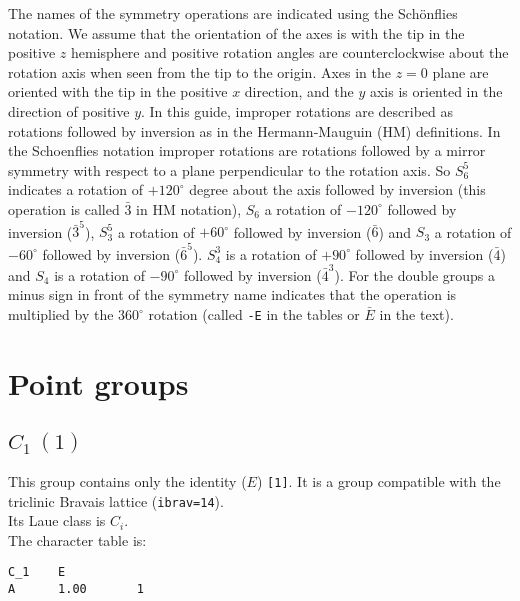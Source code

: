 \documentclass[12pt,a4paper,twoside]{report}
\begin{document}
The names of the symmetry operations are indicated using
the Sch\"onflies notation. 
We assume that the orientation of the axes is with the tip in the positive
$z$ hemisphere and positive rotation angles are counterclockwise about 
the rotation axis when seen from the tip to the origin. Axes in the $z=0$ 
plane are oriented with the tip in the
positive $x$ direction, and the $y$ axis is oriented in the 
direction of positive $y$. In this guide, improper rotations are described 
as rotations followed by inversion as in the Hermann-Mauguin (HM) 
definitions. In the Schoenflies notation improper rotations are rotations
followed by a mirror symmetry with respect to a plane perpendicular to 
the rotation axis.
So $S_6^5$ indicates a rotation of $+120^\circ$ degree about the axis 
followed by inversion (this operation is called $\bar 3$ in 
HM notation), $S_6$ a rotation of 
$-120^\circ$ followed by inversion ($\bar 3^5$), $S_3^5$ a rotation 
of $+60^\circ$ followed by inversion ($\bar 6$) and
$S_3$ a rotation of $-60^\circ$ followed by inversion ($\bar 6^5$).
$S_4^3$ is a rotation of $+90^\circ$ followed by inversion ($\bar 4$) and
$S_4$ is a rotation of $-90^\circ$ followed by inversion ($\bar 4^3$).
For the double groups a minus sign in front of the symmetry name
indicates that the operation is multiplied by the $360^\circ$ rotation 
(called \texttt{-E} in the tables or $\bar E$ in the text).

\newpage
{\color{dark-blue}\chapter{Point groups}}

{\color{coral}\section{$C_1\ (1)$}}
\color{black}
This group contains only the identity ($E$) \texttt{[1]}. 
It is a group compatible with the triclinic Bravais lattice 
(\texttt{ibrav=14}). \\
Its Laue class is $C_i$. \\
The character table is:

\begin{tcolorbox}
\begin{footnotesize}
\begin{verbatim}
C_1    E    
A      1.00       1
\end{verbatim}
\end{footnotesize}
\end{tcolorbox}
 
\end{document}
